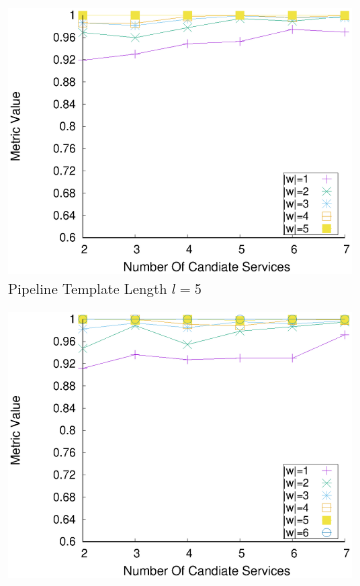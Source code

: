 \begin{figure}[ht!]
\begin{subfigure}{0.49\textwidth}
        \label{fig:quality_window_wide_qualitative_n4}
      \end{subfigure}
      \hfill
      \begin{subfigure}{0.49\textwidth}
        \includegraphics[width=\textwidth]{Images/graphs/window_quality_performance_diff_qual_n7_s7_20_100_n5}
        \caption{Pipeline Template Length $l$$=$5}
        \label{fig:quality_window_wide_qualitative_n5}
      \end{subfigure}
      \hfill
      \begin{subfigure}{0.49\textwidth}
        \includegraphics[width=\textwidth]{Images/graphs/window_quality_performance_diff_qual_n7_s7_20_100_n6}

\end{subfigure}
\end{figure}
